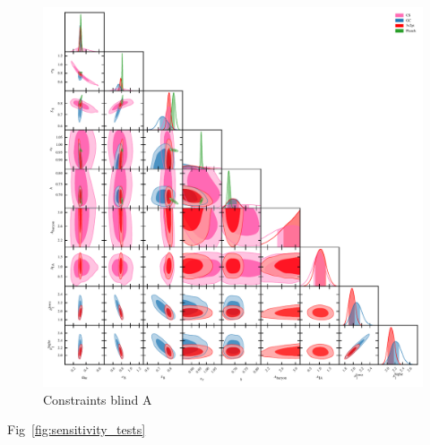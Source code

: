 \begin{figure}
	\begin{center}
		\includegraphics[width=\textwidth]{Parameter_Plots/cosmology/omegam_sigma8_s8_ns_h_a_baryon_a_ia_b1l_b1h_blind_A}
		\caption{Constraints blind A}
		\label{fig:cosmology-params-all}
	\end{center}
\end{figure}

Fig~\ref{fig:sensitivity_tests}

